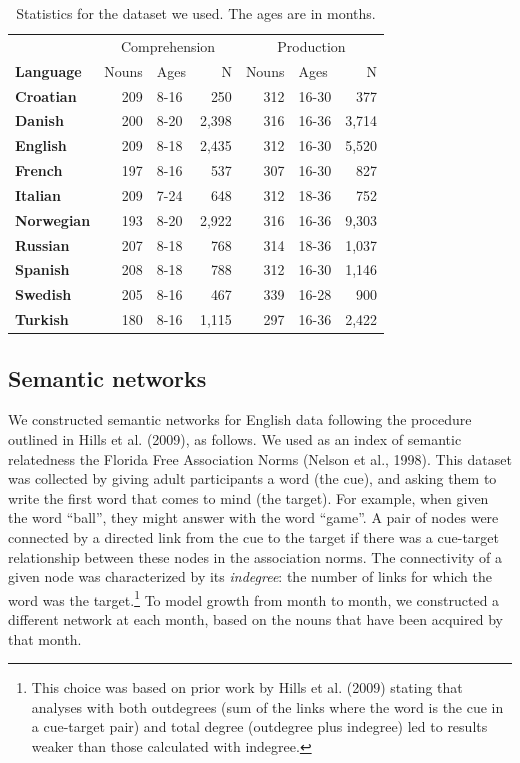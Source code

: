 \documentclass[english,floatsintext,man]{apa6}
\theoremstyle{definition}
\theoremstyle{definition}
\theoremstyle{definition}
\theoremstyle{remark}
\begin{document}
\begin{table}

\caption{\label{tab:stats}Statistics for the dataset we used. The ages are in months.}
\centering
\begin{tabular}[t]{>{\bfseries}lrlrrlr}
\toprule
\multicolumn{1}{c}{} & \multicolumn{3}{c}{Comprehension} & \multicolumn{3}{c}{Production} \\
\cmidrule(l{2pt}r{2pt}){2-4} \cmidrule(l{2pt}r{2pt}){5-7}
Language & Nouns & Ages & N & Nouns & Ages & N\\
\midrule
Croatian & 209 & 8-16 & 250 & 312 & 16-30 & 377\\
Danish & 200 & 8-20 & 2,398 & 316 & 16-36 & 3,714\\
English & 209 & 8-18 & 2,435 & 312 & 16-30 & 5,520\\
French & 197 & 8-16 & 537 & 307 & 16-30 & 827\\
Italian & 209 & 7-24 & 648 & 312 & 18-36 & 752\\
Norwegian & 193 & 8-20 & 2,922 & 316 & 16-36 & 9,303\\
Russian & 207 & 8-18 & 768 & 314 & 18-36 & 1,037\\
Spanish & 208 & 8-18 & 788 & 312 & 16-30 & 1,146\\
Swedish & 205 & 8-16 & 467 & 339 & 16-28 & 900\\
Turkish & 180 & 8-16 & 1,115 & 297 & 16-36 & 2,422\\
\bottomrule
\end{tabular}
\end{table}

\subsection{Semantic networks}\label{semantic-networks}

We constructed semantic networks for English data following the
procedure outlined in Hills et al. (2009), as follows. We used as an
index of semantic relatedness the Florida Free Association Norms (Nelson
et al., 1998). This dataset was collected by giving adult participants a
word (the cue), and asking them to write the first word that comes to
mind (the target). For example, when given the word \enquote{ball}, they
might answer with the word \enquote{game}. A pair of nodes were
connected by a directed link from the cue to the target if there was a
cue-target relationship between these nodes in the association norms.
The connectivity of a given node was characterized by its
\emph{indegree}: the number of links for which the word was the
target.\footnote{This choice was based on prior work by Hills et al. (2009) stating that analyses with both outdegrees (sum of the links where the word is the cue in a cue-target pair) and total degree  (outdegree plus indegree) led to results weaker than those calculated with indegree.}
To model growth from month to month, we constructed a different network
at each month, based on the nouns that have been acquired by that month.
\end{document}
